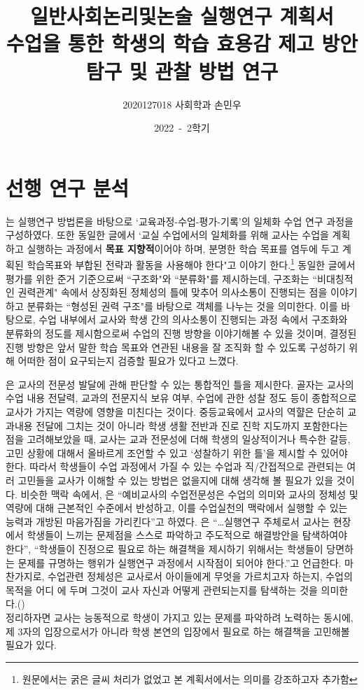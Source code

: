 \documentclass[10pt, a4paper]{oblivoir}
\date{\large 2022~-~2학기}
\title{\Huge 일반사회논리및논술 실행연구 계획서\\
    \LARGE 수업을 통한 학생의 학습 효용감 제고 방안 탐구 및 관찰 방법 연구}
\author{\Large 2020127018 사회학과 손민우}
\begin{document}
    \maketitle
    \tableofcontents*
    \pagebreak

    \section{선행 연구 분석}
    \cite{정민수2018교육과정}는 실행연구 방법론을 바탕으로 `교육과정-수업-평가-기록'의 일체화 수업 연구 과정을 구성하였다. 
    또한 동일한 글에서 `교실 수업에서의 일체화를 위해 교사는 수업을 계획하고 실행하는 과정에서 \textbf{목표 지향적}이어야 하며, 
    분명한 학습 목표를 염두에 두고 계획된 학습목표와 부합된 전략과 활동을 사용해야 한다"고 이야기 한다.\footnote{원문에서는 굵은 글씨 처리가 없었고 본 계획서에서는 의미를 강조하고자 추가함} 동일한 글에서 평가를 위한 준거 기준으로써 
    ``구조화"와 ``분류화"를 제시하는데, 구조화는 ``비대칭적인 권력관계" 속에서 상징화된 정체성의 틀에 맞추어 의사소통이 진행되는 점을 
    이야기하고 분류화는 ``형성된 권력 구조"를 바탕으로 객체를 나누는 것을 의미한다. 이를 바탕으로, 수업 내부에서 교사와 학생 간의 
    의사소통이 진행되는 과정 속에서 구조화와 분류화의 정도를 제시함으로써 수업의 진행 방향을 이야기해볼 수 있을 것이며, 결정된 진행 방향은
    앞서 말한 학습 목표와 연관된 내용을 잘 조직화 할 수 있도록 구성하기 위해 어떠한 점이 요구되는지 검증할 필요가 있다고 느꼈다. 

    \cite{강대현2013사회과}은 교사의 전문성 발달에 관해 판단할 수 있는 통합적인 틀을 제시한다. 골자는 교사의 수업 내용 전달력, 교과의 전문지식 보유 여부,
    수업에 관한 성찰 정도 등이 종합적으로 교사가 가지는 역량에 영향을 미친다는 것이다. 중등교육에서 교사의 역햘은 단순히 교과내용 전달에 그치는 것이
    아니라 학생 생활 전반과 진로 진학 지도까지 포함한다는 점을 고려해보았을 때, 교사는 교과 전문성에 더해 학생의 일상적이거나 특수한 갈등, 고민 상황에 대해서 
    올바르게 조언할 수 있고 `성찰하기 위한 틀'을 제시할 수 있어야 한다. 따라서 학생들이 수업 과정에서 가질 수 있는 수업과 직/간접적으로 관련되는 
    여러 고민들을 교사가 이해할 수 있는 방법은 없을지에 대해 생각해 볼 필요가 있을 것이다. 비슷한 맥락 속에서,
    \cite{한광웅2010사회과}은 ``예비교사의 수업전문성은 수업의 의미와 교사의 정체성 및 역량에 대해 근본적인 수준에서 반성하고,
    이를 수업실천의 맥락에서 실행할 수 있는 능력과 개방된 마음가짐을 가리킨다''고 하였다. \cite{leeEnglish}은 ``\dots 실행연구 주체로서 교사는 
    현장에서 학생들이 느끼는 문제점을 스스로 파악하고 주도적으로 해결방안을 탐색하여야 한다'', ``학생들이 진정으로 필요로 하는 해결책을 제시하기 위해서는 
    학생들이 당면하는 문제를 규명하는 행위가 실행연구 과정에서 시작점이 되어야 한다.''고 언급한다. 마찬가지로, 수업관련 정체성은 교사로서 아이들에게 무엇을 가르치고자 하는지, 수업의 목적을 어디
    에 두며 그것이 교사 자신과 어떻게 관련되는지를 탐색하는 것을 의미한다.(\cite{강지영2011국내})\\
    정리하자면 교사는 능동적으로 학생이 가지고 있는 문제를 파악하려 노력하는 동시에, 제 3자의 입장으로서가 아니라 학생 본연의 입장에서 
    필요로 하는 해결책을 고민해볼 필요가 있다. 
\end{document}
